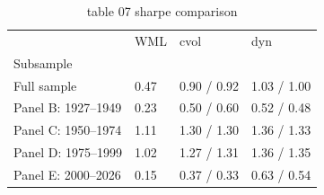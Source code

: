 \begin{table}[htbp]
  \centering
  \caption{table 07 sharpe comparison}
  \label{tab:table_07_sharpe_comparison}
  \begin{tabular}{llll}
\toprule
 & WML & cvol & dyn \\
Subsample &  &  &  \\
\midrule
Full sample & 0.47 & 0.90 / 0.92 & 1.03 / 1.00 \\
Panel B: 1927–1949 & 0.23 & 0.50 / 0.60 & 0.52 / 0.48 \\
Panel C: 1950–1974 & 1.11 & 1.30 / 1.30 & 1.36 / 1.33 \\
Panel D: 1975–1999 & 1.02 & 1.27 / 1.31 & 1.36 / 1.35 \\
Panel E: 2000–2026 & 0.15 & 0.37 / 0.33 & 0.63 / 0.54 \\
\bottomrule
\end{tabular}

\end{table}
